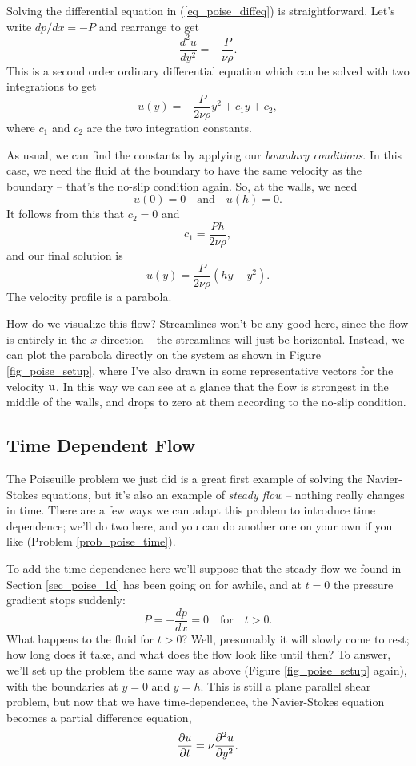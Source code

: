 Solving the differential equation in (\ref{eq_poise_diffeq}) is straightforward.  Let's write $dp/dx = -P$ and rearrange to get
\[
\frac{d^2u}{dy^2} = -\frac{P}{\nu \rho}.
\]
This is a second order ordinary differential equation which can be solved with two integrations to get
\[
u(y) = -\frac{P}{2\nu \rho} y^2 + c_1 y + c_2,
\]
where $c_1$ and $c_2$ are the two integration constants.

As usual, we can find the constants by applying our \emph{boundary conditions}.  In this case, we need the fluid at the boundary to have the same velocity as the boundary -- that's the no-slip condition again.  So, at the walls, we need
\[
u(0) = 0 \quad \text{and} \quad u(h) = 0.
\]
It follows from this that $c_2 = 0$ and
\[
c_1 = \frac{Ph}{2\nu \rho},
\]
and our final solution is
\begin{equation}
\label{eq_poise_steady}
u(y) = \frac{P}{2\nu \rho} (hy - y^2).
\end{equation}
The velocity profile is a parabola. 

How do we visualize this flow? Streamlines won't be any good here, since the flow is entirely in the $x$-direction -- the streamlines will just be horizontal.  Instead, we can plot the parabola directly on the system as shown in  Figure \ref{fig_poise_setup}, where I've also drawn in some representative vectors for the velocity $\mathbf{u}$.  In this way we can see at a glance that the flow is strongest in the middle of the walls, and drops to zero at them according to the no-slip condition.




\subsection{Time Dependent Flow}
\label{sec_poise_time}

The Poiseuille problem we just did is a great first example of solving the Navier-Stokes equations, but it's also an example of \emph{steady flow} -- nothing really changes in time. There are a few ways we can adapt this problem to introduce time dependence; we'll do two here, and you can do another one on your own if you like (Problem \ref{prob_poise_time}).

To add the time-dependence here we'll suppose that the steady flow we found in Section \ref{sec_poise_1d} has been going on for awhile, and at $t=0$ the pressure gradient stops suddenly:
\[
P = - \frac{dp}{dx} = 0 \quad \text{for} \quad t>0.
\]
What happens to the fluid for $t>0$?  Well, presumably it will slowly come to rest; how long does it take, and what does the flow look like until then?  To answer, we'll set up the problem the same way as above (Figure \ref{fig_poise_setup} again), with the boundaries at $y=0$ and $y=h$.  This is still a plane parallel shear problem, but now that we have time-dependence, the Navier-Stokes equation becomes a partial difference equation,
\begin{equation}
\label{eq_poise_pde}
\frac{\partial {u}}{\partial {t}} = \nu \frac{\partial^2 {u}}{\partial {y}^2}.
\end{equation}

